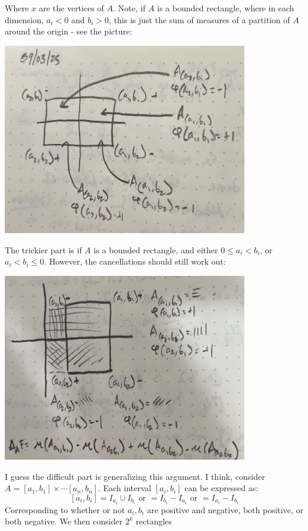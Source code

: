 \documentclass[12pt,a4paper]{article}
\newcommand{\1}[1]{\mathbbm{1}\left\{ #1 \right\}}
\begin{document}
Where $x$ are the vertices of $A$. Note, if $A$ is a bounded rectangle, where in each dimension, $a_i < 0$ and $b_i > 0$, this is just the sum of measures of a partition of $A$ around the origin - see the picture:
\begin{center}
\includegraphics[width=0.8\textwidth]{rec_diff_1.jpg}
\end{center}
The trickier part is if $A$ is a bounded rectangle, and either $0 \leq a_i < b_i$, or $a_i < b_i \leq 0$. However, the cancellations should still work out:
\begin{center}
	\includegraphics[width=0.8\textwidth]{rec_diff_2.jpg}
\end{center}
I guess the difficult part is generalizing this argument. I think, consider $A = [a_1,b_1] \times \cdots [a_n,b_n]$. Each interval $[a_i,b_i]$ can be expressed as:
$$
	[a_i,b_i] = I_{a_i} \cup I_{b_i} \text{ or } = I_{b_i} - I_{a_i} \text{ or } = I_{a_i} - I_{b_i}
$$
Corresponding to whether or not $a_i,b_i$ are positive and negative, both positive, or both negative. We then consider $2^k$ rectangles
\end{document}
